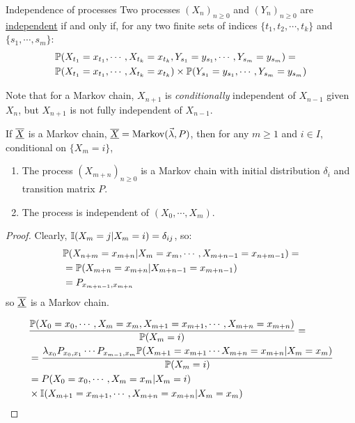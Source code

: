 \documentclass[../Main.tex]{subfiles}
\begin{document}
\begin{definition}{Independence of processes}
    Two processes $(X_n)_{n \geq 0}$ and $(Y_n)_{n \geq 0}$ are \underline{independent} if and only if, for any two finite sets of indices $\{t_1, t_2, \cdots, t_k\}$ and $\{s_1, \cdots, s_m\}$:
    \begin{align*}
        &\P(X_{t_1} = x_{t_1}, \cdots, X_{t_k} = x_{t_k}, Y_{s_1} = y_{s_1}, \cdots, Y_{s_m} = y_{s_m}) = \\
        &\P(X_{t_1} = x_{t_1}, \cdots, X_{t_k} = x_{t_k}) \times \P(Y_{s_1} = y_{s_1}, \cdots, Y_{s_m} = y_{s_m})
    \end{align*}
\end{definition}
Note that for a Markov chain, $X_{n+1}$ is \textit{conditionally} independent of $X_{n-1}$ given $X_n$, but $X_{n+1}$ is not fully independent of $X_{n-1}$.
\begin{theorem}
    If $\chain{X}$ is a Markov chain, $\chain{X} = \text{Markov}(\vec{\lambda}, P)$, then for any $m \geq 1$ and $i \in I$, conditional on $\{X_m = i\}$,
    \begin{enumerate}
        \item The process $(X_{m + n})_{n \geq 0}$ is a Markov chain with initial distribution $\delta_i$ and transition matrix $P$.
        \item The process is independent of $(X_0, \cdots, X_m)$.
    \end{enumerate}
    \label{thmMarkovProperty}
\end{theorem}
\begin{proof}
    Clearly, $\ind{X_m = j | X_m = i} = \delta_{ij}$, so:
    \begin{align*}
        &\P(X_{n + m} = x_{m + n} | X_m = x_m, \cdots, X_{m + n - 1} = x_{n + m - 1}) = \\
        &= \P(X_{m + n} = x_{m + n} | X_{m + n - 1} = x_{m + n - 1}) \\
        &= \Pmat{m + n - 1}{m + n}
    \end{align*}
    so $\chain{X}$ is a Markov chain.

    \begin{align*}
        &\frac{\P(X_0 = x_0, \cdots, X_m = x_m, X_{m + 1} = x_{m + 1}, \cdots, X_{m + n} = x_{m + n})}{\P(X_m = i)} = \\
        &= \frac{\lambda_{x_0} \Pmat{0}{1} \cdots \Pmat{m-1}{m} \P(X_{m + 1} = x_{m + 1} \cdots X_{m + n} = x_{m + n} | X_m = x_m)}{\P(X_m = i)} \\
        &= P(X_0 = x_0, \cdots, X_m = x_m | X_m = i) \\
        &\times \ind{X_{m + 1} = x_{m + 1}, \cdots, X_{m + n} = x_{m + n} | X_m = x_m}
    \end{align*}
\end{proof}
\end{document}
